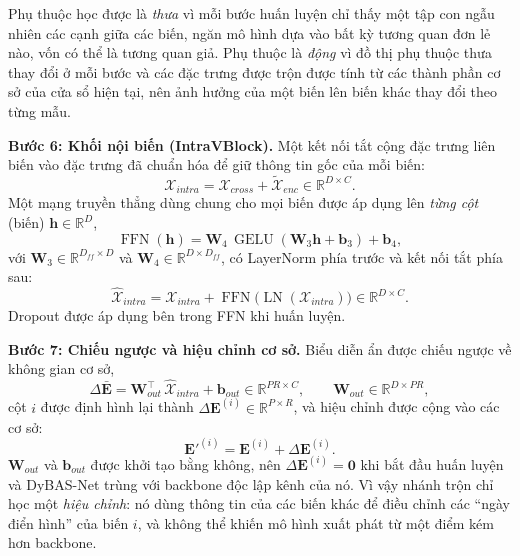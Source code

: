 \documentclass[conference]{IEEEtran}
\newcommand{\R}{\mathbb{R}}
\newcommand{\LN}{\operatorname{LN}}
\newcommand{\GELU}{\operatorname{GELU}}
\newcommand{\FFN}{\operatorname{FFN}}
\begin{document}
Phụ thuộc học được là \emph{thưa} vì mỗi bước huấn luyện chỉ thấy một tập con ngẫu nhiên các cạnh giữa các biến, ngăn mô
hình dựa vào bất kỳ tương quan đơn lẻ nào, vốn có thể là tương quan giả. Phụ thuộc là \emph{động} vì đồ thị phụ thuộc thưa
thay đổi ở mỗi bước và các đặc trưng được trộn được tính từ các thành phần cơ sở của cửa sổ hiện tại, nên ảnh hưởng của
một biến lên biến khác thay đổi theo từng mẫu.

\textbf{Bước 6: Khối nội biến (IntraVBlock).} Một kết nối tắt cộng đặc trưng liên biến vào đặc trưng đã chuẩn hóa để giữ
thông tin gốc của mỗi biến:
\begin{equation}
\mathcal{X}_{intra}=\mathcal{X}_{cross}+\tilde{\mathcal{X}}_{enc}\in\R^{D\times C}.
\label{eq:cross-res}
\end{equation}
Một mạng truyền thẳng dùng chung cho mọi biến được áp dụng lên \emph{từng cột} (biến) $\mathbf{h}\in\R^{D}$,
\begin{equation}
\FFN(\mathbf{h})=\mathbf{W}_4\,\GELU(\mathbf{W}_3\mathbf{h}+\mathbf{b}_3)+\mathbf{b}_4,
\label{eq:ffn}
\end{equation}
với $\mathbf{W}_3\in\R^{D_{ff}\times D}$ và $\mathbf{W}_4\in\R^{D\times D_{ff}}$, có LayerNorm phía trước và kết nối tắt
phía sau:
\begin{equation}
\hat{\mathcal{X}}_{intra}=\mathcal{X}_{intra}+\FFN\big(\LN(\mathcal{X}_{intra})\big)\in\R^{D\times C}.
\label{eq:intra}
\end{equation}
Dropout được áp dụng bên trong FFN khi huấn luyện.

\textbf{Bước 7: Chiếu ngược và hiệu chỉnh cơ sở.} Biểu diễn ẩn được chiếu ngược về không gian cơ sở,
\begin{equation}
\Delta\bar{\mathbf{E}}=\mathbf{W}_{out}^{\top}\,\hat{\mathcal{X}}_{intra}+\mathbf{b}_{out}\in\R^{PR\times C},
\qquad \mathbf{W}_{out}\in\R^{D\times PR},
\label{eq:proj}
\end{equation}
cột $i$ được định hình lại thành $\Delta\mathbf{E}^{(i)}\in\R^{P\times R}$, và hiệu chỉnh được cộng vào các cơ sở:
\begin{equation}
\mathbf{E}'^{(i)}=\mathbf{E}^{(i)}+\Delta\mathbf{E}^{(i)}.
\label{eq:correct}
\end{equation}
$\mathbf{W}_{out}$ và $\mathbf{b}_{out}$ được khởi tạo bằng không, nên $\Delta\mathbf{E}^{(i)}=\mathbf{0}$ khi bắt đầu
huấn luyện và DyBAS-Net trùng với backbone độc lập kênh của nó. Vì vậy nhánh trộn chỉ học một \emph{hiệu chỉnh}: nó dùng
thông tin của các biến khác để điều chỉnh các ``ngày điển hình'' của biến $i$, và không thể khiến mô hình xuất phát từ một
điểm kém hơn backbone.
\end{document}
